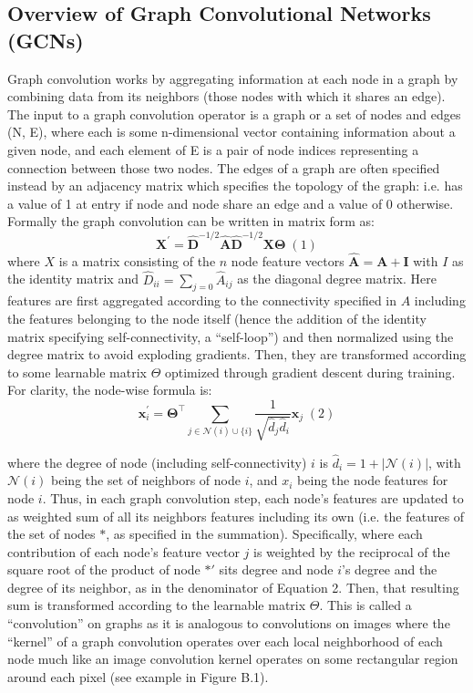 \subsection{Overview of Graph Convolutional Networks (GCNs)}
Graph convolution \cite{kipfSemiSupervisedClassificationGraph2017} works by aggregating information at each node in a graph by combining data from its neighbors (those nodes with which it shares an edge). The input to a graph convolution operator is a graph or a set of nodes and edges (N, E), where each is some n-dimensional vector containing information about a given node, and each element of E is a pair of node indices representing a connection between those two nodes. The edges of a graph are often specified instead by an adjacency matrix which specifies the topology of the graph: i.e. has a value of 1 at entry if node and node share an edge and a value of 0 otherwise. Formally the graph convolution can be written in matrix form as:
$$\mathbf{X}^{\prime} = \mathbf{\hat{D}}^{-1/2}\mathbf{\hat{A}}\mathbf{\hat{D}}^{-1/2} \mathbf{X} \mathbf{\Theta} \;(1)$$
where $X$ is a matrix consisting of the $n$ node feature vectors $\mathbf{\hat{A}} = \mathbf{A} + \mathbf{I}$ with $I$ as the identity matrix and $\hat{D}_{ii} = \sum_{j=0} \hat{A}_{ij}$ as the diagonal degree matrix. Here features are first aggregated according to the connectivity specified in $A$ including the features belonging to the node itself (hence the addition of the identity matrix specifying self-connectivity, a “self-loop”) and then normalized using the degree matrix to avoid exploding gradients. Then, they are transformed according to some learnable matrix $\Theta$ optimized through gradient descent during training. For clarity, the node-wise formula is: 
$$\mathbf{x}^{\prime}_i = \mathbf{\Theta}^{\top} \sum_{j \in \mathcal{N}(i) \cup \{ i \}} \frac{1}{\sqrt{\hat{d}_j \hat{d}_i}} \mathbf{x}_j \;(2)$$

where the degree of node (including self-connectivity) $i$ is $\hat{d}_i = 1 + |\mathcal{N}(i)|$, with $\mathcal{N}(i)$ being the set of neighbors of node $i$, and $x_i$ being the node features for node $i$. Thus, in each graph convolution step, each node's features are updated to as weighted sum of all its neighbors features including its own (i.e. the features of the set of nodes $*$, as specified in the summation). Specifically, where each contribution of each node's feature vector $j$ is weighted by the reciprocal of the square root of the product of node $*'$ sits degree and node $i$'s degree and the degree of its neighbor, as in the denominator of Equation 2. Then, that resulting sum is transformed according to the learnable matrix $\Theta$. This is called a “convolution” on graphs as it is analogous to convolutions on images where the “kernel” of a graph convolution operates over each local neighborhood of each node much like an image convolution kernel operates on some rectangular region around each pixel (see example in Figure B.1). 

